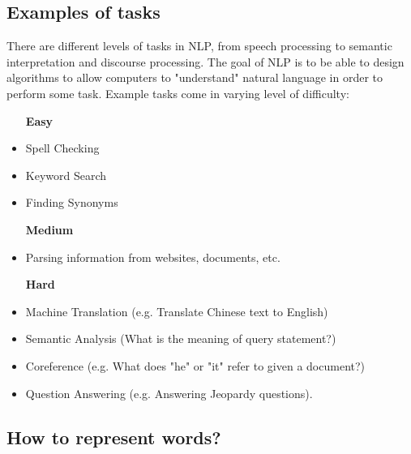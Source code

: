 \documentclass[nobib]{tufte-handout}
\begin{document}
\subsection{Examples of tasks}


There are different levels of tasks in NLP, from speech processing to semantic interpretation and discourse processing. The goal of NLP is to be able to design algorithms to allow computers to "understand" natural language in order to perform some task. Example tasks come in varying level of difficulty:


\begin{itemize}
\item [\textbf{Easy}]
\item Spell Checking
\item Keyword Search
\item Finding Synonyms
\item [\textbf{Medium}]
\item Parsing information from websites, documents, etc.
\item [\textbf{Hard}]
\item Machine Translation (e.g. Translate Chinese text to English)
\item Semantic Analysis (What is the meaning of query statement?)
\item Coreference (e.g. What does "he" or "it" refer to given a document?) 
\item Question Answering (e.g. Answering Jeopardy questions).
\end{itemize}


\subsection{How to represent words?}
\end{document}
